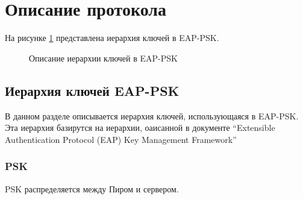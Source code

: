 \newpage
\section{Описание протокола}

На рисунке \ref{img:key_hierarchy} представлена иерархия ключей в EAP-PSK.

\begin{figure}[h!]
\caption{Описание иерархии ключей в EAP-PSK}
\label{img:key_hierarchy}
\end{figure}

\subsection{Иерархия ключей EAP-PSK}

В данном разделе описывается иерархия ключей, использующаяся в EAP-PSK. Эта иерархия базирутся на иерархии, оаисанной в документе ``Extensible Authentication Protocol (EAP) Key Management Framework''

\subsubsection{PSK}

PSK распределяется между Пиром и сервером.


